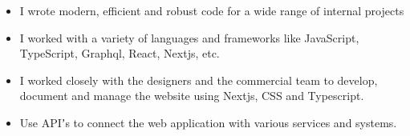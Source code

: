 

\begin{itemize}
    \item I wrote modern, efficient and robust code for a wide range of internal projects
    \item I worked with a variety of languages and frameworks like JavaScript, TypeScript, Graphql, React, Nextjs, etc.
    \item I worked closely with the designers and the commercial team to develop, document and manage the website using Nextjs, CSS and Typescript.
    \item Use APIʼs to connect the web application with various services and systems.
\end{itemize}

